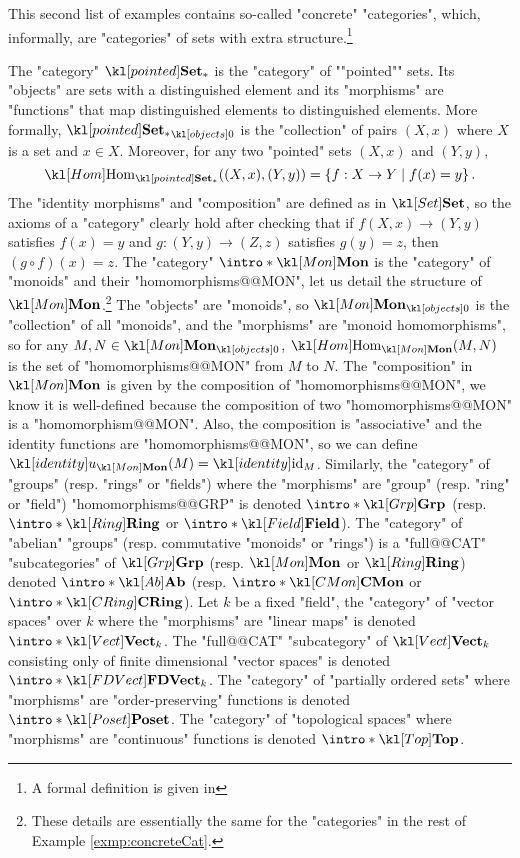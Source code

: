 \documentclass[main.tex]{subfiles}
\begin{document}
\begin{exmp}\label{exmp:concreteCat}
	This second list of examples contains so-called "concrete" "categories", which, informally, are "categories" of sets with extra structure.\footnote{A formal definition is given in }%
	\begin{enumerate}
		\itemAP The "category" $\catPtd$ is the "category" of ""pointed"" sets. Its "objects" are sets with a distinguished element and its "morphisms" are "functions" that map distinguished elements to distinguished elements. More formally, $\obj{\catPtd}$ is the "collection" of pairs $(X,x)$ where $X$ is a set and $x \in X$. Moreover, for any two "pointed" sets $(X,x)$ and $(Y,y)$, 
		\[\Hom_{\catPtd}((X,x), (Y,y)) = \left\{ f: X \rightarrow Y \mid f(x) = y \right\}.\]
		The "identity morphisms" and "composition" are defined as in $\catSet$, so the axioms of a "category" clearly hold after checking that if $f(X,x) \rightarrow (Y,y)$ satisfies $f(x) =y$ and $g: (Y,y) \rightarrow (Z,z)$ satisfies $g(y) = z$, then $(g\circ f)(x) = z$.
		\itemAP The "category" $\intro*\catMon$ is the "category" of "monoids" and their "homomorphisms@@MON", let us detail the structure of $\catMon$.\footnote{These details are essentially the same for the "categories" in the rest of Example \ref{exmp:concreteCat}.} The "objects" are "monoids", so $\obj{\catMon}$ is the "collection" of all "monoids", and the "morphisms" are "monoid homomorphisms", so for any $M, N \in \obj{\catMon}$, $\Hom_{\catMon}(M,N)$ is the set of "homomorphisms@@MON" from $M$ to $N$. The "composition" in $\catMon$ is given by the composition of "homomorphisms@@MON", we know it is well-defined because the composition of two "homomorphisms@@MON" is a "homomorphism@@MON". Also, the composition is "associative" and the identity functions are "homomorphisms@@MON", so we can define $\idu_{\catMon}(M) = \id_M$. %
		\itemAP Similarly, the "category" of "groups" (resp. "rings" or "fields") where the "morphisms" are "group" (resp. "ring" or "field") "homomorphisms@@GRP" is denoted $\intro*\catGrp$ (resp. $\intro*\catRing$ or $\intro*\catField$). \AP The "category" of "abelian" "groups" (resp. commutative "monoids" or "rings") is a "full@@CAT" "subcategories" of $\catGrp$ (resp. $\catMon$ or $\catRing$) denoted $\intro*\catAb$ (resp. $\intro*\catCMon$ or $\intro*\catCRing$).
		\itemAP Let $k$ be a fixed "field", the "category" of "vector spaces" over $k$ where the "morphisms" are "linear maps" is denoted $\intro*\catVect{k}$. \AP The "full@@CAT" "subcategory" of $\catVect{k}$ consisting only of finite dimensional "vector spaces" is denoted $\intro*\catFDVect{k}$.
		\itemAP The "category" of "partially ordered sets" where "morphisms" are "order-preserving" functions is denoted $\intro*\catPoset$.
		\itemAP The "category" of "topological spaces" where "morphisms" are "continuous" functions is denoted $\intro*\catTop$.
	\end{enumerate}
\end{exmp}
\end{document}
